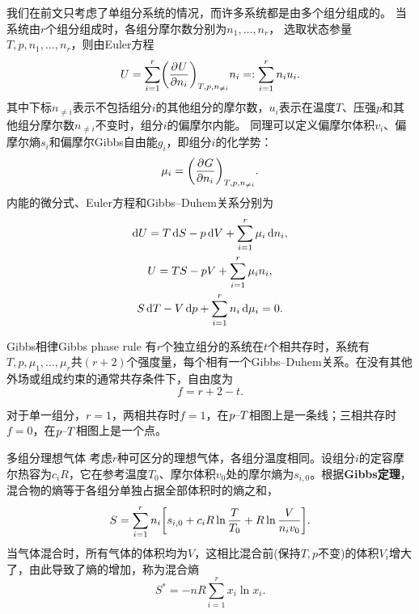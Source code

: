 我们在前文只考虑了单组分系统的情况，而许多系统都是由多个组分组成的。
当系统由$r$个组分组成时，各组分摩尔数分别为$n_1,\ldots,n_r$，
选取状态参量$T,p,n_1,\ldots,n_r$，则由Euler方程
\begin{equation}
	U = \sum_{i=1}^r\pvat{U}{n_i}{T,p,n_{\neq i}}n_i =: \sum_{i=1}^rn_iu_i.
\end{equation}
其中下标$n_{\neq i}$表示不包括组分$i$的其他组分的摩尔数，$u_i$表示在温度$T$、压强$p$和其他组分摩尔数$n_{\neq i}$不变时，组分$i$的偏摩尔内能。
同理可以定义偏摩尔体积$v_i$、偏摩尔熵$s_i$和偏摩尔Gibbs自由能$g_i$，即组分$i$的化学势：
\begin{equation}
	\mu_i = \pvat{G}{n_i}{T,p,n_{\neq i}}.
\end{equation}
内能的微分式、Euler方程和Gibbs--Duhem关系分别为
\begin{subequations}
	\begin{gather}
		\d U = T\d S - p\d V + \sum_{i=1}^r\mu_i\d n_i,\\
		U = TS - pV + \sum_{i=1}^r\mu_in_i,\\
		S\d T - V\d p + \sum_{i=1}^rn_i\d\mu_i = 0.
	\end{gather}
\end{subequations}

\begin{theorem}
	{Gibbs相律}{Gibbs phase rule}
	有$r$个独立组分的系统在$t$个相共存时，系统有$T,p,\mu_1,\ldots,\mu_r$共$(r + 2)$个强度量，每个相有一个Gibbs--Duhem关系。在没有其他外场或组成约束的通常共存条件下，自由度为
	\begin{equation}
		f = r + 2 - t.
	\end{equation}
\end{theorem}

\begin{corollary}
	对于单一组分，$r = 1$，两相共存时$f = 1$，在$p\vs T$相图上是一条线；三相共存时$f = 0$，在$p\vs T$相图上是一个点。
\end{corollary}

\begin{example}
	{多组分理想气体}{}
	考虑$r$种可区分的理想气体，各组分温度相同。设组分$i$的定容摩尔热容为$c_iR$，它在参考温度$T_0$、摩尔体积$v_0$处的摩尔熵为$s_{i,0}$。根据\textbf{Gibbs定理}，混合物的熵等于各组分单独占据全部体积时的熵之和，
	\[
		S = \sum_{i=1}^rn_i\biggb{s_{i,0} + c_iR\ln\frac{T}{T_0} + R\ln\frac{V}{n_iv_0}} .
	\]
	当气体混合时，所有气体的体积均为$V$，这相比混合前(保持$T,p$不变)的体积$V_i$增大了，由此导致了熵的增加，称为混合熵
	\begin{equation}
		\label{eqn:mixing entropy}
		S^* = -nR\sum_{i=1}^rx_i\ln x_i.
	\end{equation}
	\begin{notecaptionblock}
	\end{notecaptionblock}
\end{example}

